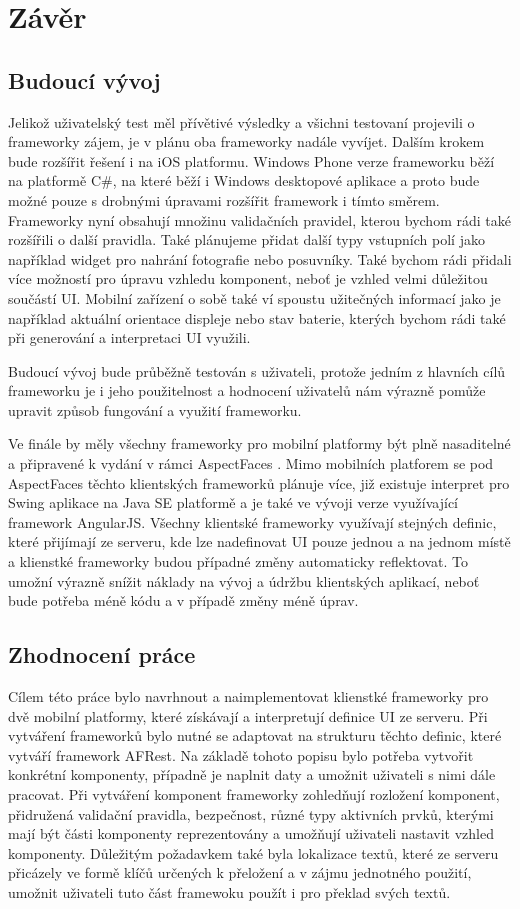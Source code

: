 \chapter{Závěr}
\section{Budoucí vývoj}
Jelikož uživatelský test měl přívětivé výsledky a všichni testovaní projevili o frameworky zájem, je v plánu oba frameworky nadále vyvíjet. Dalším krokem bude rozšířit řešení i na iOS platformu. Windows Phone verze frameworku běží na platformě C\#, na které běží i Windows desktopové aplikace a proto bude možné pouze s drobnými úpravami rozšířit framework i tímto směrem. Frameworky nyní obsahují množinu validačních pravidel, kterou bychom rádi také rozšířili o další pravidla. Také plánujeme přidat další typy vstupních polí jako například widget pro nahrání fotografie nebo posuvníky. Také bychom rádi přidali více možností pro úpravu vzhledu komponent, neboť je vzhled velmi důležitou součástí UI. Mobilní zařízení o sobě také ví spoustu užitečných informací jako je například aktuální orientace displeje nebo stav baterie, kterých bychom rádi také při generování a interpretaci UI využili.

Budoucí vývoj bude průběžně testován s uživateli, protože jedním z hlavních cílů frameworku je i jeho použitelnost a hodnocení uživatelů nám výrazně pomůže upravit způsob fungování a využití frameworku.

Ve finále by měly všechny frameworky pro mobilní platformy být plně nasaditelné a připravené k vydání v rámci AspectFaces \cite{aspect-faces}. Mimo mobilních platforem se pod AspectFaces těchto klientských frameworků plánuje více, již existuje interpret pro Swing aplikace na Java SE platformě a je také ve vývoji verze využívající framework AngularJS. Všechny klientské frameworky využívají stejných definic, které přijímají ze serveru, kde lze nadefinovat UI pouze jednou a na jednom místě a klienstké frameworky budou případné změny automaticky reflektovat. To umožní výrazně snížit náklady na vývoj a údržbu klientských aplikací, neboť bude potřeba méně kódu a v případě změny méně úprav.

\section{Zhodnocení práce}
Cílem této práce bylo navrhnout a naimplementovat klienstké frameworky pro dvě mobilní platformy, které získávají a interpretují definice UI ze serveru. Při vytváření frameworků bylo nutné se adaptovat na strukturu těchto definic, které vytváří framework AFRest. Na základě tohoto popisu bylo potřeba vytvořit konkrétní komponenty, případně je naplnit daty a umožnit uživateli s nimi dále pracovat. Při vytváření komponent frameworky zohledňují rozložení komponent, přidružená validační pravidla, bezpečnost, různé typy aktivních prvků, kterými mají být části komponenty reprezentovány a umožňují uživateli nastavit vzhled komponenty. Důležitým požadavkem také byla lokalizace textů, které ze serveru přicázely ve formě klíčů určených k přeložení a v zájmu jednotného použití, umožnit uživateli tuto část framewoku použít i pro překlad svých textů. 

